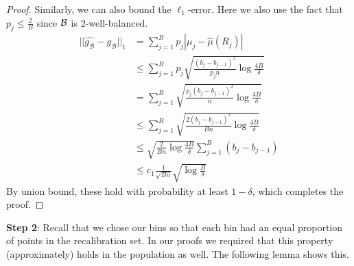 \begin{proof}
Similarly, we can also bound the $\ell_1$-error. Here we also use the fact that $p_j \leq \frac{2}{B}$ since $\mathcal{B}{}$ is 2-well-balanced.
\begin{align*}
||\hat{g_{\mathcal{B}}} - g_{\mathcal{B}}||_1 &= \sum_{j =1}^B p_j |\mu_j - \hat{\mu}(R_j)| \\
&\leq \sum_{j =1}^B p_j \sqrt{\frac{(b_j - b_{j-1})^2}{p_jn} \log{\frac{4B}{\delta}}} \\
&=\sum_{j =1}^B \sqrt{\frac{p_j(b_j - b_{j-1})^2}{n} \log{\frac{4B}{\delta}}} \\
&\leq \sum_{j =1}^B \sqrt{\frac{2(b_j - b_{j-1})^2}{Bn} \log{\frac{4B}{\delta}}} \\
&\leq \sqrt{\frac{2}{Bn} \log{\frac{4B}{\delta}}} \sum_{j =1}^B (b_j - b_{j-1}) \\
&\leq c_1 \frac{1}{\sqrt{Bn}} \sqrt{\log{\frac{B}{\delta}}}
\end{align*}
By union bound, these hold with probability at least $1 - \delta$, which completes the proof.
\end{proof}

\textbf{Step 2}: Recall that we chose our bins so that each bin had an equal proportion of points in the recalibration set. In our proofs we required that this property (approximately) holds in the population as well. The following lemma shows this.

\begin{wellBalanced}
\wellBalancedText{}
\end{wellBalanced}

